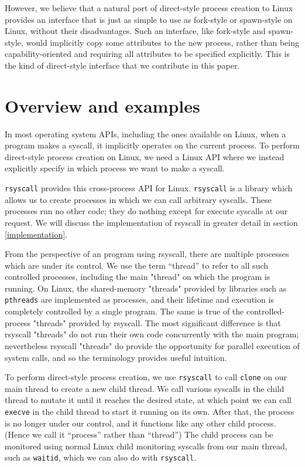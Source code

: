 \documentclass{acmart}
\begin{document}
However, we believe that a natural port of direct-style process creation to Linux
provides an interface that is just as simple to use as fork-style or spawn-style on Linux,
without their disadvantages.
Such an interface, like fork-style and spawn-style,
would implicitly copy some attributes to the new process,
rather than being capability-oriented and requiring all attributes to be specified explicitly.
This is the kind of direct-style interface that we contribute in this paper.

\section{Overview and examples}\label{examples}
In most operating system APIs, including the ones available on Linux,
when a program makes a syscall, it implicitly operates on the current process.
To perform direct-style process creation on Linux,
we need a Linux API where we instead explicitly specify in which process we want to make a syscall.

\texttt{rsyscall} provides this cross-process API for Linux.
\texttt{rsyscall} is a library which allows us to create processes in which we can call arbitrary syscalls.
These processes run no other code; they do nothing except for execute syscalls at our request.
We will discuss the implementation of rsyscall in greater detail in section \ref{implementation}.

From the perspective of an program using rsyscall,
there are multiple processes which are under its control.
We use the term ``thread'' to refer to all such controlled processes,
including the main "thread" on which the program is running.
On Linux, the shared-memory "threads" provided by libraries such as \texttt{pthreads}
are implemented as processes,
and their lifetime and execution is completely controlled by a single program.
The same is true of the controlled-process "threads" provided by rsyscall.
The most significant difference is that rsyscall "threads"
do not run their own code concurrently with the main program;
nevertheless rsyscall "threads" do provide the opportunity for parallel execution of system calls,
and so the terminology provides useful intuition.

To perform direct-style process creation,
we use \texttt{rsyscall} to call \texttt{clone} on our main thread to create a new child thread.
We call various syscalls in the child thread to mutate it until it reaches the desired state,
at which point we can call \texttt{execve} in the child thread to start it running on its own.
After that, the process is no longer under our control, and it functions like any other child process.
(Hence we call it ``process'' rather than ``thread'')
The child process can be monitored using normal Linux child monitoring syscalls from our main thread,
such as \texttt{waitid},
which we can also do with \texttt{rsyscall}.
\end{document}
